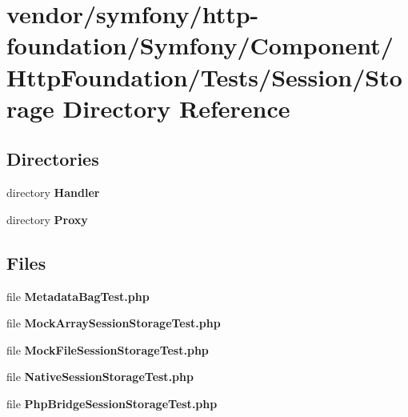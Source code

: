 \section{vendor/symfony/http-\/foundation/\+Symfony/\+Component/\+Http\+Foundation/\+Tests/\+Session/\+Storage Directory Reference}
\label{dir_858a5ee836b53b5ed58d77c88176a1e7}
\subsection*{Directories}
\begin{DoxyCompactItemize}
\item 
directory {\bf Handler}
\item 
directory {\bf Proxy}
\end{DoxyCompactItemize}
\subsection*{Files}
\begin{DoxyCompactItemize}
\item 
file {\bf Metadata\+Bag\+Test.\+php}
\item 
file {\bf Mock\+Array\+Session\+Storage\+Test.\+php}
\item 
file {\bf Mock\+File\+Session\+Storage\+Test.\+php}
\item 
file {\bf Native\+Session\+Storage\+Test.\+php}
\item 
file {\bf Php\+Bridge\+Session\+Storage\+Test.\+php}
\end{DoxyCompactItemize}
